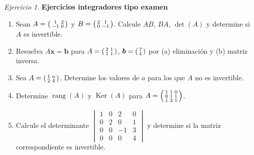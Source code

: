 \documentclass[12pt]{article}
\theoremstyle{remark}
\newtheorem{Ejer}[definicion]{Ejercicio}
\newcommand{\rang}{\operatorname{rang}}
\newcommand{\Ker}{\operatorname{Ker}}
\newcommand{\vect}[1]{\boldsymbol{#1}}
\begin{document}
\begin{Ejer}
\textbf{Ejercicios integradores tipo examen}
\begin{enumerate}[resume=banco]
\item Sean $A=\begin{psmallmatrix}1&2\\-1&0\end{psmallmatrix}$ y $B=\begin{psmallmatrix}2&1\\0&-1\end{psmallmatrix}$. Calcule $AB$, $BA$, $\det(A)$ y determine si $A$ es invertible.
\item Resuelva $A\vect x=\vect b$ para $A=\begin{psmallmatrix}2&1\\1&1\end{psmallmatrix}$, $\vect b=\begin{psmallmatrix}7\\4\end{psmallmatrix}$ por (a) eliminación y (b) matriz inversa.
\item Sea $A=\begin{psmallmatrix}1&a\\2&4\end{psmallmatrix}$. Determine los valores de $a$ para los que $A$ no es invertible.
\item Determine $\rang(A)$ y $\Ker(A)$ para $A=\begin{psmallmatrix}1&1&0\\0&1&1\\1&2&1\end{psmallmatrix}$.
\item Calcule el determinante $\begin{vmatrix}1&0&2&0\\0&2&0&1\\0&0&-1&3\\0&0&0&4\end{vmatrix}$ y determine si la matriz correspondiente es invertible.
\end{enumerate}
\end{Ejer}
\end{document}
